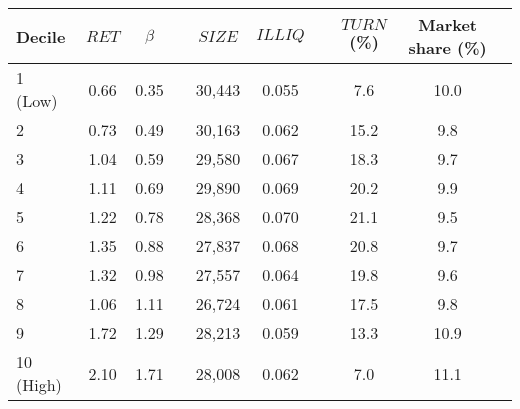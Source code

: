 \begin{tabular}{@{}lccccccccc@{}}
	\toprule
	Decile & $\textit{RET}$ & $\beta$ && $\textit{SIZE}$ & $\textit{ILLIQ}$ && $\textit{TURN}$ (\%) & Market share (\%) \\ \midrule
1 (Low) & 0.66 & 0.35 && 30,443 & 0.055 && 7.6 & 10.0 \\
2       & 0.73 & 0.49 && 30,163 & 0.062 && 15.2 & 9.8 \\
3       & 1.04 & 0.59 && 29,580 & 0.067 && 18.3 & 9.7 \\
4       & 1.11 & 0.69 && 29,890 & 0.069 && 20.2 & 9.9 \\
5       & 1.22 & 0.78 && 28,368 & 0.070 && 21.1 & 9.5 \\
6       & 1.35 & 0.88 && 27,837 & 0.068 && 20.8 & 9.7 \\
7       & 1.32 & 0.98 && 27,557 & 0.064 && 19.8 & 9.6 \\
8       & 1.06 & 1.11 && 26,724 & 0.061 && 17.5 & 9.8 \\
9       & 1.72 & 1.29 && 28,213 & 0.059 && 13.3 & 10.9 \\
10 (High) & 2.10 & 1.71 && 28,008 & 0.062 && 7.0 & 11.1 \\
	\bottomrule
\end{tabular}